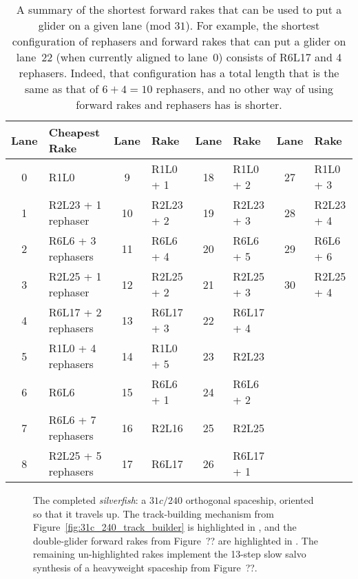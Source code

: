 \begin{table}[!htbp]
	\centering
	\begin{tabular}{c l | c l | c l | c l}
		\toprule
		Lane & Cheapest Rake & Lane & Rake & Lane & Rake & Lane & Rake \\ \midrule
		0 & R1L0 & 9 & R1L0 + 1 & 18 & R1L0 + 2 & 27 & R1L0 + 3 \\
		1 & R2L23 + 1 rephaser & 10 & R2L23 + 2 & 19 & R2L23 + 3 & 28 & R2L23 + 4\\
		2 & R6L6 + 3 rephasers & 11 & R6L6 + 4 & 20 & R6L6 + 5 & 29 & R6L6 + 6 \\
		3 & R2L25 + 1 rephaser & 12 & R2L25 + 2 & 21 & R2L25 + 3 & 30 & R2L25 + 4 \\
		4 & R6L17 + 2 rephasers & 13 & R6L17 + 3 & 22 & R6L17 + 4 & & \\
		5 & R1L0 + 4 rephasers & 14 & R1L0 + 5 & 23 & R2L23 & & \\
		6 & R6L6 & 15 & R6L6 + 1 & 24 & R6L6 + 2 & & \\
		7 & R6L6 + 7 rephasers & 16 & R2L16 & 25 & R2L25 & & \\
		8 & R2L25 + 5 rephasers & 17 & R6L17 & 26 & R6L17 + 1 & & \\
		\bottomrule
	\end{tabular}
	\caption{A summary of the shortest forward rakes that can be used to put a glider on a given lane (mod $31$). For example, the shortest configuration of rephasers and forward rakes that can put a glider on lane~22 (when currently aligned to lane~0) consists of R6L17 and 4 rephasers. Indeed, that configuration has a total length that is the same as that of $6 + 4 = 10$ rephasers, and no other way of using forward rakes and rephasers has is shorter.}\label{tab:silverfish_forward_rakes}
\end{table}

\begin{figure}[!htbp]
	\centering
	\caption{The completed \emph{silverfish}: a $31c/240$ orthogonal spaceship, oriented so that it travels up. The track-building mechanism from Figure~\ref{fig:31c_240_track_builder} is highlighted in , and the double-glider forward rakes from Figure~?? are highlighted in . The remaining un-highlighted rakes implement the 13-step slow salvo synthesis of a heavyweight spaceship from Figure~??.}\label{fig:silverfish}
\end{figure}

